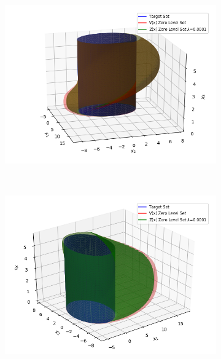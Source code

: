 \begin{figure}[h]
    \centering
    \begin{subfigure}[t]{0.3\textwidth}
        \centering
        \includegraphics[trim= 4cm 0cm 0cm 0cm, scale=0.45]{air_3d_v1}
    \end{subfigure}%
    ~ 
    \begin{subfigure}[t]{0.3\textwidth}
        \centering
        \includegraphics[trim= 3cm 0cm 0cm 0cm, clip=true, scale=0.45]{air_3d_v2}
    \end{subfigure}
    ~
    \begin{subfigure}[t]{0.3\textwidth}
        \centering

\end{subfigure}
\end{figure}
